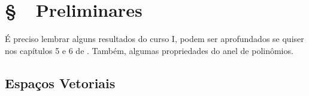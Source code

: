 \section*{\S \ \ Preliminares}

É preciso lembrar alguns resultados do curso I, podem ser aprofundados se quiser nos capítulos 5 e 6 de \cite{MA719}. Também, algumas propriedades do anel de polinômios.  



\subsection*{Espaços Vetoriais}

